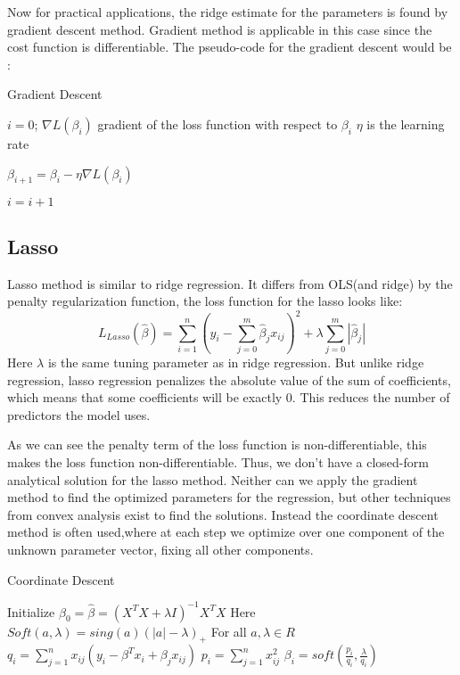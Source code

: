 \documentclass{article}
\begin{document}
Now for practical applications, the ridge estimate for the parameters is found by gradient descent method. Gradient method is applicable in this case since the cost function is differentiable.
The pseudo-code for the gradient descent would be :

\begin{algorithm}
\caption{Gradient Descent}\label{alg:cap}
\begin{algorithmic}
\State $i = 0$;
\State $\nabla L(\beta_i)$ gradient of the loss function with respect to $\beta_i$
\State $\eta$ is the learning rate

    \State $\beta_{i+1}=\beta_i-\eta \nabla L(\beta_i)$

    \State $i=i+1$

\end{algorithmic}
\end{algorithm}



\subsection*{Lasso}
Lasso method is similar to ridge regression. It differs from OLS(and ridge) by the penalty regularization function, the loss function for the lasso looks like:
\begin{displaymath} 
L_{Lasso}(\hat{\beta})=\sum_{i=1}^{n}{(y_i-\sum_{j=0}^{m}{\hat{\beta}_j x_{i j} })^2} + \lambda\sum_{j=0}^{m}{|\hat{\beta}_j|}
\end{displaymath}
Here $\lambda$ is the same tuning parameter as in ridge regression. But unlike ridge regression, lasso regression penalizes the absolute value of the sum of coefficients, which means that some coefficients will be exactly 0. This reduces the number of predictors the model uses.

As we can see the penalty term of the loss function is non-differentiable, this makes the loss function non-differentiable. Thus, we don't have a closed-form analytical solution for the lasso method.
Neither can we apply the gradient method to find the optimized parameters for the regression, but other techniques from convex analysis exist to find the solutions. Instead the coordinate descent method is often used,where at each step we optimize over one component of the unknown parameter vector, fixing all other components. 
\begin{algorithm}[H]%
\caption{Coordinate Descent}\label{alg:cap}
\State Initialize $\beta_0=\hat{\beta}=(X^{T}X+\lambda I)^{-1}X^TX $
\State Here $Soft(a,\lambda)=sing(a)(|a|-\lambda)_+$ For all $a,\lambda\in R$ 
\Repeat
{}
    \State $q_i=\sum_{j=1}^{n}{x_{i j}(y_i-\beta^T x_i + \beta_j x_{ij})}$
    \State $p_i=\sum_{j=1}^{n}{x_{ij}^2}$
    \State $\beta_i=soft(\frac{p_i}{q_i},\frac{\lambda}{q_i})$
\EndFor{}
\end{algorithm}
\end{document}
